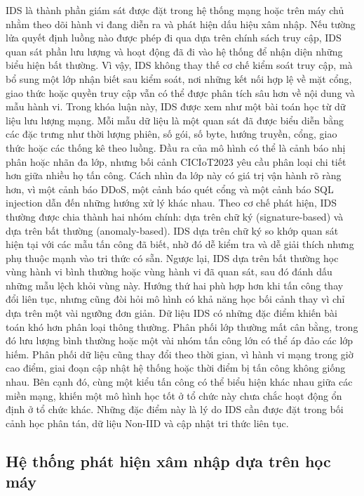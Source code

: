IDS là thành phần giám sát được đặt trong hệ thống mạng hoặc trên máy chủ nhằm theo dõi hành vi đang diễn ra và phát hiện dấu hiệu xâm nhập. Nếu tường lửa quyết định luồng nào được phép đi qua dựa trên chính sách truy cập, IDS quan sát phần lưu lượng và hoạt động đã đi vào hệ thống để nhận diện những biểu hiện bất thường. Vì vậy, IDS không thay thế cơ chế kiểm soát truy cập, mà bổ sung một lớp nhận biết sau kiểm soát, nơi những kết nối hợp lệ về mặt cổng, giao thức hoặc quyền truy cập vẫn có thể được phân tích sâu hơn về nội dung và mẫu hành vi.
\bigbreak\noindent
Trong khóa luận này, IDS được xem như một bài toán học từ dữ liệu lưu lượng mạng. Mỗi mẫu dữ liệu là một quan sát đã được biểu diễn bằng các đặc trưng như thời lượng phiên, số gói, số byte, hướng truyền, cổng, giao thức hoặc các thống kê theo luồng. Đầu ra của mô hình có thể là cảnh báo nhị phân hoặc nhãn đa lớp, nhưng bối cảnh CICIoT2023 yêu cầu phân loại chi tiết hơn giữa nhiều họ tấn công. Cách nhìn đa lớp này có giá trị vận hành rõ ràng hơn, vì một cảnh báo DDoS, một cảnh báo quét cổng và một cảnh báo SQL injection dẫn đến những hướng xử lý khác nhau.
\bigbreak\noindent
Theo cơ chế phát hiện, IDS thường được chia thành hai nhóm chính: dựa trên chữ ký (signature-based) và dựa trên bất thường (anomaly-based). IDS dựa trên chữ ký so khớp quan sát hiện tại với các mẫu tấn công đã biết, nhờ đó dễ kiểm tra và dễ giải thích nhưng phụ thuộc mạnh vào tri thức có sẵn. Ngược lại, IDS dựa trên bất thường học vùng hành vi bình thường hoặc vùng hành vi đã quan sát, sau đó đánh dấu những mẫu lệch khỏi vùng này. Hướng thứ hai phù hợp hơn khi tấn công thay đổi liên tục, nhưng cũng đòi hỏi mô hình có khả năng học bối cảnh thay vì chỉ dựa trên một vài ngưỡng đơn giản.
\bigbreak\noindent
Dữ liệu IDS có những đặc điểm khiến bài toán khó hơn phân loại thông thường. Phân phối lớp thường mất cân bằng, trong đó lưu lượng bình thường hoặc một vài nhóm tấn công lớn có thể áp đảo các lớp hiếm. Phân phối dữ liệu cũng thay đổi theo thời gian, vì hành vi mạng trong giờ cao điểm, giai đoạn cập nhật hệ thống hoặc thời điểm bị tấn công không giống nhau. Bên cạnh đó, cùng một kiểu tấn công có thể biểu hiện khác nhau giữa các miền mạng, khiến một mô hình học tốt ở tổ chức này chưa chắc hoạt động ổn định ở tổ chức khác. Những đặc điểm này là lý do IDS cần được đặt trong bối cảnh học phân tán, dữ liệu Non-IID và cập nhật tri thức liên tục.

\subsection{Hệ thống phát hiện xâm nhập dựa trên học máy}

